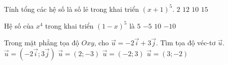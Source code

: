 \begin{ex}%
	Tính tổng các hệ số là số lẻ trong khai triển $(x+1)^5$.
	\choice
	{$2$}
	{\True $12$}
	{$10$}
	{$15$}
\end{ex}

\begin{ex}%
	Hệ số của $x^4$ trong khai triển $(1-x)^5$ là
	\choice
	{\True $5$}
	{$-5$}
	{$10$}
	{$-10$}
\end{ex}

\begin{ex}%
	Trong mặt phẳng tọa độ $Oxy$, cho $\vec{u}=-2\vec{i}+3\vec{j}$. Tìm tọa độ véc-tơ $\vec{u}$.
	\choice
	{$\vec{u}=(-2\vec{i};3\vec{j})$}
	{$\vec{u}=(2;-3)$}
	{\True $\vec{u}=(-2;3)$}
	{$\vec{u}=(3;-2)$}
\end{ex}

